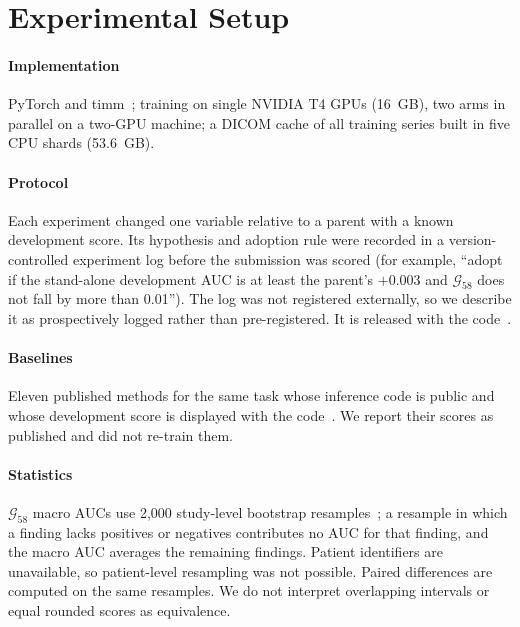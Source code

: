 \documentclass{ieeeaccess}
\newcommand{\gold}{$\mathcal{G}_{58}$}
\begin{document}
\section{Experimental Setup}
\label{sec:setup}

\paragraph*{Implementation} PyTorch and timm~\cite{wightman2019timm}; training on single NVIDIA T4 GPUs (16~GB), two arms
in parallel on a two-GPU machine; a DICOM cache of all training series built in five CPU shards (53.6~GB).

\paragraph*{Protocol} Each experiment changed one variable relative to a parent with a known development score. Its
hypothesis and adoption rule were recorded in a version-controlled experiment log before the submission was scored
(for example, ``adopt if the stand-alone development AUC is at least the parent's $+0.003$ and \gold{} does not fall by
more than 0.01''). The log was not registered externally, so we describe it as prospectively logged rather than
pre-registered. It is released with the code~\cite{hack2publish2026repo}.

\paragraph*{Baselines} Eleven published methods for the same task whose inference code is public and whose development
score is displayed with the code~\cite{dread2026raptor,hengck2026mavit,mattiaangeli2026dino,jiweiliu2026fast,goodpjw2026stack,pjm2026d4,nartaa2026mirror,sujan2026apex,heliosli2026blend}.
We report their scores as published and did not re-train them.

\paragraph*{Statistics} \gold{} macro AUCs use 2,000 study-level bootstrap resamples~\cite{efron1993bootstrap}; a resample
in which a finding lacks positives or negatives contributes no AUC for that finding, and the macro AUC averages the
remaining findings. Patient identifiers are unavailable, so patient-level resampling was not possible. Paired differences
are computed on the same resamples. We do not interpret overlapping intervals or equal rounded scores as equivalence.
\end{document}
